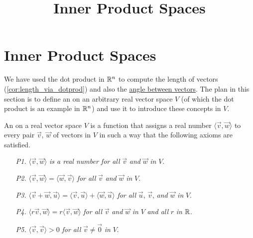 \documentclass{ximera}
\title{Inner Product Spaces} \license{CC BY-NC-SA 4.0}
\begin{document}
\begin{abstract}
 \end{abstract}
\maketitle

\section*{Inner Product Spaces}

We have used the dot product in $\mathbb{R}^n$ to compute the length of vectors (\ref{cor:length_via_dotprod}) and also the \href{https://ximera.osu.edu/oerlinalg/LinearAlgebra/VEC-0060/main}{angle between vectors}. The plan in this section is to define an  on an arbitrary real vector space $V$ (of which the dot product is an example in $\mathbb{R}^n$) and use it to introduce these concepts in $V$.

\begin{definition}\label{def:innerproductspace}
An  on a real vector space $V$ is a function that assigns a real number $\langle\vec{v}, \vec{w}\rangle$ to every pair $\vec{v}$, $\vec{w}$ of vectors in $V$ in such a way that the following axioms are satisfied.
\end{definition}
\begin{itemize}
\item[\textit{P1.}]\label{prop:inner_prod_1}  $\langle\vec{v}, \vec{w}\rangle$ \textit{is a real number for all} $\vec{v}$ \textit{and} $\vec{w}$ \textit{in} $V$.

\item[\textit{P2.}]\label{prop:inner_prod_2}  $\langle\vec{v}, \vec{w}\rangle = \langle\vec{w}, \vec{v}\rangle$ \textit{for all} $\vec{v}$ \textit{and} $\vec{w}$ \textit{in} $V$.

\item[\textit{P3.}]\label{prop:inner_prod_3}  $\langle\vec{v} + \vec{w}, \vec{u}\rangle = \langle\vec{v}, \vec{u}\rangle + \langle\vec{w}, \vec{u}\rangle$ \textit{for all} $\vec{u}$, $\vec{v}$, \textit{and} $\vec{w}$ \textit{in} $V$.

\item[\textit{P4.}]\label{prop:inner_prod_4} $\langle r\vec{v}, \vec{w}\rangle = r\langle\vec{v}, \vec{w}\rangle$ \textit{for all} $\vec{v}$ \textit{and} $\vec{w}$ \textit{in} $V$ \textit{and all} $r$ \textit{in} $\mathbb{R}$.

\item[\textit{P5.}]\label{prop:inner_prod_5}  $\langle\vec{v}, \vec{v}\rangle > 0$ \textit{for all} $\vec{v} \neq \vec{0}$ \textit{in} $V$.

\end{itemize}
\end{document}
